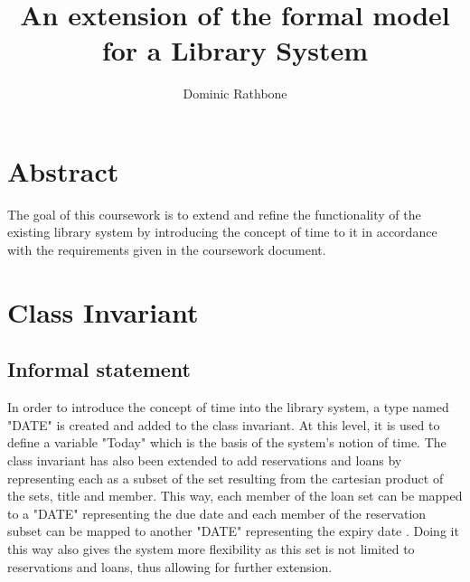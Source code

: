 \documentclass[]{article}
\title{An extension of the formal model for a Library System}
\author{Dominic Rathbone}
\begin{document}
\maketitle
\newpage

\section{Abstract}
The goal of this coursework is to extend and refine the functionality of the existing library system by introducing the concept of time to it in accordance with the requirements given in the coursework document.

\section{Class Invariant}
\subsection{Informal statement}
In order to introduce the concept of time into the library system, a type named "DATE" is created and added to the class invariant. At this level, it is used to define a variable "Today" which is the basis of the system's notion of time. The class invariant has also been extended to add reservations and loans by representing each as a subset of the set resulting from the cartesian product of the sets, title and member. This way, each member of the loan set can be mapped to a "DATE" representing the due date and each member of the reservation subset can be mapped to another "DATE" representing the expiry date . Doing it this way also gives the system more flexibility as this set is not limited to reservations and loans, thus allowing for further extension.
\end{document}
